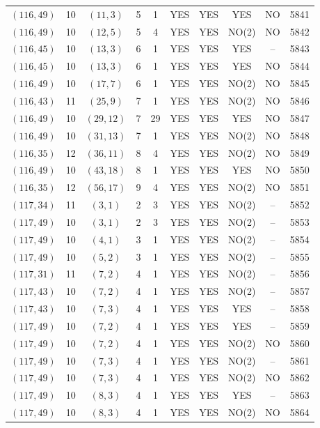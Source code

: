 \begin{longtable}{|c|c|c|c|c|c|c|c|c|c|}
$(116, 49)$ & 10 & $(11, 3)$ & 5 & 1 & YES & YES & YES & NO & 5841\\
$(116, 49)$ & 10 & $(12, 5)$ & 5 & 4 & YES & YES & NO(2) & NO & 5842\\
$(116, 45)$ & 10 & $(13, 3)$ & 6 & 1 & YES & YES & YES & -- & 5843\\
$(116, 45)$ & 10 & $(13, 3)$ & 6 & 1 & YES & YES & YES & NO & 5844\\
$(116, 49)$ & 10 & $(17, 7)$ & 6 & 1 & YES & YES & NO(2) & NO & 5845\\
$(116, 43)$ & 11 & $(25, 9)$ & 7 & 1 & YES & YES & NO(2) & NO & 5846\\
$(116, 49)$ & 10 & $(29, 12)$ & 7 & 29 & YES & YES & YES & NO & 5847\\
$(116, 49)$ & 10 & $(31, 13)$ & 7 & 1 & YES & YES & NO(2) & NO & 5848\\
$(116, 35)$ & 12 & $(36, 11)$ & 8 & 4 & YES & YES & NO(2) & NO & 5849\\
$(116, 49)$ & 10 & $(43, 18)$ & 8 & 1 & YES & YES & YES & NO & 5850\\
$(116, 35)$ & 12 & $(56, 17)$ & 9 & 4 & YES & YES & NO(2) & NO & 5851\\
$(117, 34)$ & 11 & $(3, 1)$ & 2 & 3 & YES & YES & NO(2) & -- & 5852\\
$(117, 49)$ & 10 & $(3, 1)$ & 2 & 3 & YES & YES & NO(2) & -- & 5853\\
$(117, 49)$ & 10 & $(4, 1)$ & 3 & 1 & YES & YES & NO(2) & -- & 5854\\
$(117, 49)$ & 10 & $(5, 2)$ & 3 & 1 & YES & YES & NO(2) & -- & 5855\\
$(117, 31)$ & 11 & $(7, 2)$ & 4 & 1 & YES & YES & NO(2) & -- & 5856\\
$(117, 43)$ & 10 & $(7, 2)$ & 4 & 1 & YES & YES & NO(2) & -- & 5857\\
$(117, 43)$ & 10 & $(7, 3)$ & 4 & 1 & YES & YES & YES & -- & 5858\\
$(117, 49)$ & 10 & $(7, 2)$ & 4 & 1 & YES & YES & YES & -- & 5859\\
$(117, 49)$ & 10 & $(7, 2)$ & 4 & 1 & YES & YES & NO(2) & NO & 5860\\
$(117, 49)$ & 10 & $(7, 3)$ & 4 & 1 & YES & YES & NO(2) & -- & 5861\\
$(117, 49)$ & 10 & $(7, 3)$ & 4 & 1 & YES & YES & NO(2) & NO & 5862\\
$(117, 49)$ & 10 & $(8, 3)$ & 4 & 1 & YES & YES & YES & -- & 5863\\
$(117, 49)$ & 10 & $(8, 3)$ & 4 & 1 & YES & YES & NO(2) & NO & 5864\\

\end{longtable}
